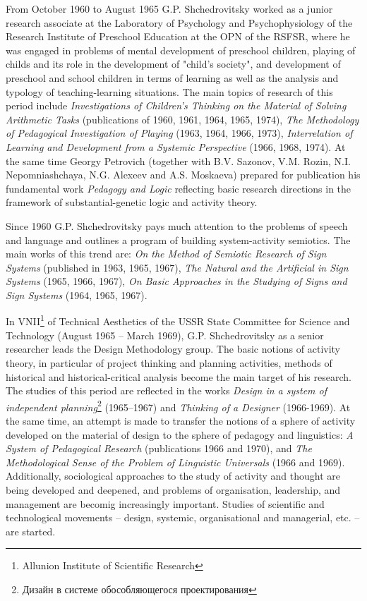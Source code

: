 \documentclass[a4paper,11pt]{article}
\begin{document}
From October 1960 to August 1965 G.P. Shchedrovitsky worked as a junior
research associate at the Laboratory of Psychology and Psychophysiology of the
Research Institute of Preschool Education at the OPN of the RSFSR, where he
was engaged in problems of mental development of preschool children, playing
of childs and its role in the development of "child's society", and
development of preschool and school children in terms of learning as well as
the analysis and typology of teaching-learning situations. The main topics of
research of this period include \emph{Investigations of Children's Thinking on
  the Material of Solving Arithmetic Tasks} (publications of 1960, 1961, 1964,
1965, 1974), \emph{The Methodology of Pedagogical Investigation of Playing}
(1963, 1964, 1966, 1973), \emph{Interrelation of Learning and Development from
  a Systemic Perspective} (1966, 1968, 1974). At the same time Georgy
Petrovich (together with B.V. Sazonov, V.M. Rozin, N.I. Nepomniashchaya,
N.G. Alexeev and A.S. Moskaeva) prepared for publication his fundamental work
\emph{Pedagogy and Logic} reflecting basic research directions in the
framework of substantial-genetic logic and activity theory.

Since 1960 G.P. Shchedrovitsky pays much attention to the problems of speech
and language and outlines a program of building system-activity semiotics. The
main works of this trend are: \emph{On the Method of Semiotic Research of Sign
  Systems} (published in 1963, 1965, 1967), \emph{The Natural and the
  Artificial in Sign Systems} (1965, 1966, 1967), \emph{On Basic Approaches in
  the Studying of Signs and Sign Systems} (1964, 1965, 1967).

In VNII\footnote{Allunion Institute of Scientific Research} of Technical
Aesthetics of the USSR State Committee for Science and Technology (August 1965
-- March 1969), G.P. Shchedrovitsky as a senior researcher leads the Design
Methodology group. The basic notions of activity theory, in particular of
project thinking and planning activities, methods of historical and
historical-critical analysis become the main target of his research. The
studies of this period are reflected in the works \emph{Design in a system of
  independent planning}\footnote{\foreignlanguage{russian}{Дизайн в системе
    обособляющегося проектирования}} (1965--1967) and \emph{Thinking of a
  Designer} (1966-1969). At the same time, an attempt is made to transfer the
notions of a sphere of activity developed on the material of design to the
sphere of pedagogy and linguistics: \emph{A System of Pedagogical Research}
(publications 1966 and 1970), and \emph{The Methodological Sense of the
  Problem of Linguistic Universals} (1966 and 1969). Additionally,
sociological approaches to the study of activity and thought are being
developed and deepened, and problems of organisation, leadership, and
management are becomig increasingly important. Studies of scientific and
technological movements -- design, systemic, organisational and managerial,
etc. -- are started.
\end{document}
